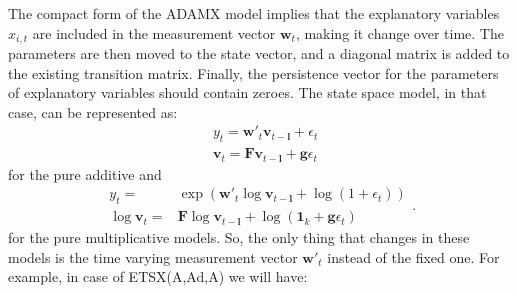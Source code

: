 \documentclass[
]{book}
\theoremstyle{definition}
\theoremstyle{definition}
\theoremstyle{definition}
\theoremstyle{definition}
\theoremstyle{remark}
\begin{document}
The compact form of the ADAMX model implies that the explanatory variables \(x_{i,t}\) are included in the measurement vector \(\mathbf{w}_{t}\), making it change over time. The parameters are then moved to the state vector, and a diagonal matrix is added to the existing transition matrix. Finally, the persistence vector for the parameters of explanatory variables should contain zeroes. The state space model, in that case, can be represented as:
\begin{equation}
  \begin{aligned}
    & {y}_{t} = \mathbf{w}'_t \mathbf{v}_{t-\mathbf{l}} + \epsilon_t \\
    & \mathbf{v}_t = \mathbf{F} \mathbf{v}_{t-\mathbf{l}} + \mathbf{g} \epsilon_t
  \end{aligned}
  \label{eq:ETSXADAMStateSpacePureAdditiveFull}
\end{equation}
for the pure additive and
\begin{equation}
  \begin{aligned}
    {y}_{t} = & \exp\left(\mathbf{w}'_t \log \mathbf{v}_{t-\mathbf{l}} + \log(1 + \epsilon_t)\right) \\
    \log \mathbf{v}_t = & \mathbf{F} \log \mathbf{v}_{t-\mathbf{l}} + \log(\mathbf{1}_k + \mathbf{g} \epsilon_t)
  \end{aligned}. 
  \label{eq:ETSXADAMStateSpacePureMultiplicativeFull}
\end{equation}
for the pure multiplicative models. So, the only thing that changes in these models is the time varying measurement vector \(\mathbf{w}'_t\) instead of the fixed one. For example, in case of ETSX(A,Ad,A) we will have:
\end{document}
